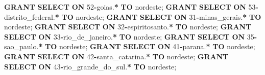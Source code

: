 \documentclass[
]{book}
\newenvironment{Shaded}{\begin{snugshade}}{\end{snugshade}}
\newcommand{\DecValTok}[1]{\textcolor[rgb]{0.00,0.00,0.81}{#1}}
\newcommand{\KeywordTok}[1]{\textcolor[rgb]{0.13,0.29,0.53}{\textbf{#1}}}
\newcommand{\NormalTok}[1]{#1}
\newcommand{\OperatorTok}[1]{\textcolor[rgb]{0.81,0.36,0.00}{\textbf{#1}}}
\newcommand{\StringTok}[1]{\textcolor[rgb]{0.31,0.60,0.02}{#1}}
\begin{document}
\begin{Shaded}
\begin{Highlighting}[]
\KeywordTok{GRANT} \KeywordTok{SELECT} \KeywordTok{ON}\NormalTok{ \textasciigrave{}}\DecValTok{52}\OperatorTok{{-}}\NormalTok{goias\textasciigrave{}.}\OperatorTok{*}             \KeywordTok{TO} \StringTok{\textquotesingle{}nordeste\textquotesingle{}}\NormalTok{;}
\KeywordTok{GRANT} \KeywordTok{SELECT} \KeywordTok{ON}\NormalTok{ \textasciigrave{}}\DecValTok{53}\OperatorTok{{-}}\NormalTok{distrito\_federal\textasciigrave{}.}\OperatorTok{*}  \KeywordTok{TO} \StringTok{\textquotesingle{}nordeste\textquotesingle{}}\NormalTok{;}
\KeywordTok{GRANT} \KeywordTok{SELECT} \KeywordTok{ON}\NormalTok{ \textasciigrave{}}\DecValTok{31}\OperatorTok{{-}}\NormalTok{minas\_gerais\textasciigrave{}.}\OperatorTok{*}      \KeywordTok{TO} \StringTok{\textquotesingle{}nordeste\textquotesingle{}}\NormalTok{;}
\KeywordTok{GRANT} \KeywordTok{SELECT} \KeywordTok{ON}\NormalTok{ \textasciigrave{}}\DecValTok{32}\OperatorTok{{-}}\NormalTok{espiritosanto\textasciigrave{}.}\OperatorTok{*}     \KeywordTok{TO} \StringTok{\textquotesingle{}nordeste\textquotesingle{}}\NormalTok{;}
\KeywordTok{GRANT} \KeywordTok{SELECT} \KeywordTok{ON}\NormalTok{ \textasciigrave{}}\DecValTok{33}\OperatorTok{{-}}\NormalTok{rio\_de\_janeiro\textasciigrave{}.}\OperatorTok{*}    \KeywordTok{TO} \StringTok{\textquotesingle{}nordeste\textquotesingle{}}\NormalTok{;}
\KeywordTok{GRANT} \KeywordTok{SELECT} \KeywordTok{ON}\NormalTok{ \textasciigrave{}}\DecValTok{35}\OperatorTok{{-}}\NormalTok{sao\_paulo\textasciigrave{}.}\OperatorTok{*}         \KeywordTok{TO} \StringTok{\textquotesingle{}nordeste\textquotesingle{}}\NormalTok{;}
\KeywordTok{GRANT} \KeywordTok{SELECT} \KeywordTok{ON}\NormalTok{ \textasciigrave{}}\DecValTok{41}\OperatorTok{{-}}\NormalTok{parana\textasciigrave{}.}\OperatorTok{*}            \KeywordTok{TO} \StringTok{\textquotesingle{}nordeste\textquotesingle{}}\NormalTok{;}
\KeywordTok{GRANT} \KeywordTok{SELECT} \KeywordTok{ON}\NormalTok{ \textasciigrave{}}\DecValTok{42}\OperatorTok{{-}}\NormalTok{santa\_catarina\textasciigrave{}.}\OperatorTok{*}    \KeywordTok{TO} \StringTok{\textquotesingle{}nordeste\textquotesingle{}}\NormalTok{;}
\KeywordTok{GRANT} \KeywordTok{SELECT} \KeywordTok{ON}\NormalTok{ \textasciigrave{}}\DecValTok{43}\OperatorTok{{-}}\NormalTok{rio\_grande\_do\_sul\textasciigrave{}.}\OperatorTok{*} \KeywordTok{TO} \StringTok{\textquotesingle{}nordeste\textquotesingle{}}\NormalTok{;}


\end{Highlighting}
\end{Shaded}
\end{document}

